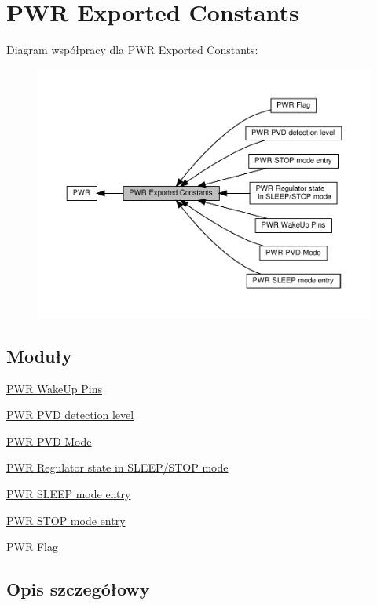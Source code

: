 \hypertarget{group___p_w_r___exported___constants}{}\section{P\+WR Exported Constants}
\label{group___p_w_r___exported___constants}
Diagram współpracy dla P\+WR Exported Constants\+:\nopagebreak
\begin{figure}[H]
\begin{center}
\leavevmode
\includegraphics[width=350pt]{group___p_w_r___exported___constants}
\end{center}
\end{figure}
\subsection*{Moduły}
\begin{DoxyCompactItemize}
\item 
\hyperlink{group___p_w_r___wake_up___pins}{P\+W\+R Wake\+Up Pins}
\item 
\hyperlink{group___p_w_r___p_v_d__detection__level}{P\+W\+R P\+V\+D detection level}
\item 
\hyperlink{group___p_w_r___p_v_d___mode}{P\+W\+R P\+V\+D Mode}
\item 
\hyperlink{group___p_w_r___regulator__state__in___s_t_o_p__mode}{P\+W\+R Regulator state in S\+L\+E\+E\+P/\+S\+T\+O\+P mode}
\item 
\hyperlink{group___p_w_r___s_l_e_e_p__mode__entry}{P\+W\+R S\+L\+E\+E\+P mode entry}
\item 
\hyperlink{group___p_w_r___s_t_o_p__mode__entry}{P\+W\+R S\+T\+O\+P mode entry}
\item 
\hyperlink{group___p_w_r___flag}{P\+W\+R Flag}
\end{DoxyCompactItemize}


\subsection{Opis szczegółowy}
